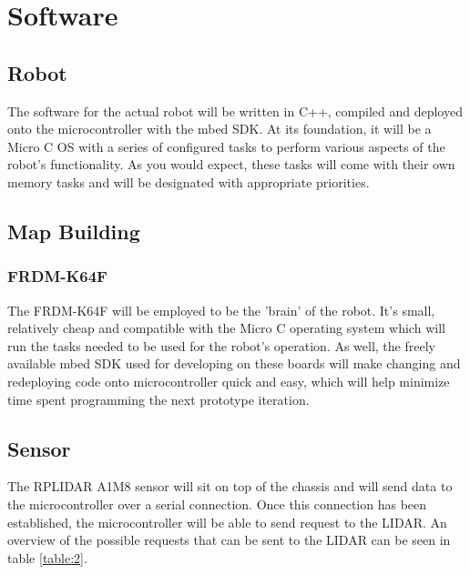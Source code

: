 	\section{Software}
		\subsection{Robot}
		The software for the actual robot will be written in C++, compiled and deployed onto the microcontroller with the mbed SDK. At its foundation, it will be a Micro C OS with a series of configured tasks to perform various aspects of the robot's functionality. As you would expect, these tasks will come with their own memory tasks and will be designated with appropriate priorities.
		
		
		\subsection{Map Building}
	
		\subsubsection{FRDM-K64F}
		The FRDM-K64F will be employed to be the 'brain' of the robot. It's small, relatively cheap and compatible with the Micro C operating system which will run the tasks needed to be used for the robot's operation. As well, the freely available mbed SDK used for developing on these boards will make changing and redeploying code onto microcontroller quick and easy, which will help minimize time spent programming the next prototype iteration.
	
		\subsection{Sensor}
		The RPLIDAR A1M8 sensor will sit on top of the chassis and will send data to the microcontroller over a serial connection. Once this connection has been established, the microcontroller will be able to send request to the LIDAR. An overview of the possible requests that can be sent to the LIDAR can be seen in table \ref{table:2}.
		
